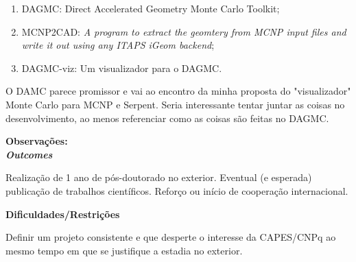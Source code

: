 \begin{enumerate}
	\item DAGMC: Direct Accelerated Geometry Monte Carlo Toolkit;
	\item MCNP2CAD: \textit{A program to extract the geomtery from MCNP input files and write it out using any ITAPS iGeom backend};
	\item DAGMC-viz: Um visualizador para o DAGMC.
\end{enumerate}

O DAMC parece promissor e vai ao encontro da minha proposta do "visualizador" Monte Carlo para MCNP e Serpent. Seria interessante tentar juntar as coisas no desenvolvimento, ao menos referenciar como as coisas são feitas no DAGMC.

\textbf{Observações:}
\\


\textbf{\textit{Outcomes}}

Realização de 1 ano de pós-doutorado no exterior. Eventual (e esperada) publicação 
de trabalhos científicos. Reforço ou início de cooperação internacional.

\textbf{Dificuldades/Restrições}

Definir um projeto consistente e que desperte o interesse da CAPES/CNPq ao mesmo 
tempo em que se justifique a estadia no exterior.


